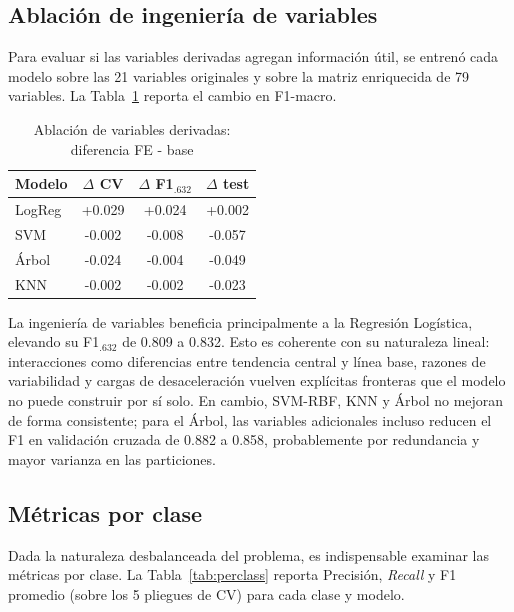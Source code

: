 \documentclass[conference]{IEEEtran}
\begin{document}
\subsection{Ablaci\'on de ingenier\'ia de variables}
Para evaluar si las variables derivadas agregan informaci\'on \'util, se entren\'o cada modelo sobre las 21 variables originales y sobre la matriz enriquecida de 79 variables. La Tabla~\ref{tab:ablation} reporta el cambio en F1-macro.

\begin{table}[!t]
\caption{Ablaci\'on de variables derivadas: diferencia FE - base}
\label{tab:ablation}
\centering
\renewcommand{\arraystretch}{1.12}
\footnotesize
\begin{tabular}{lccc}
\toprule
\textbf{Modelo} & \textbf{$\Delta$ CV} & \textbf{$\Delta$ F1$_{.632}$} & \textbf{$\Delta$ test} \\
\midrule
LogReg       & +0.029 & +0.024 & +0.002 \\
SVM          & -0.002 & -0.008 & -0.057 \\
\'Arbol      & -0.024 & -0.004 & -0.049 \\
KNN          & -0.002 & -0.002 & -0.023 \\
\bottomrule
\end{tabular}
\end{table}

La ingenier\'ia de variables beneficia principalmente a la Regresi\'on Log\'istica, elevando su F1$_{.632}$ de 0.809 a 0.832. Esto es coherente con su naturaleza lineal: interacciones como diferencias entre tendencia central y l\'inea base, razones de variabilidad y cargas de desaceleraci\'on vuelven expl\'icitas fronteras que el modelo no puede construir por s\'i solo. En cambio, SVM-RBF, KNN y \'Arbol no mejoran de forma consistente; para el \'Arbol, las variables adicionales incluso reducen el F1 en validaci\'on cruzada de 0.882 a 0.858, probablemente por redundancia y mayor varianza en las particiones.

\subsection{M\'etricas por clase}
Dada la naturaleza desbalanceada del problema, es indispensable examinar las m\'etricas por clase. La Tabla~\ref{tab:perclass} reporta Precisi\'on, \emph{Recall} y F1 promedio (sobre los 5 pliegues de CV) para cada clase y modelo.
\end{document}
